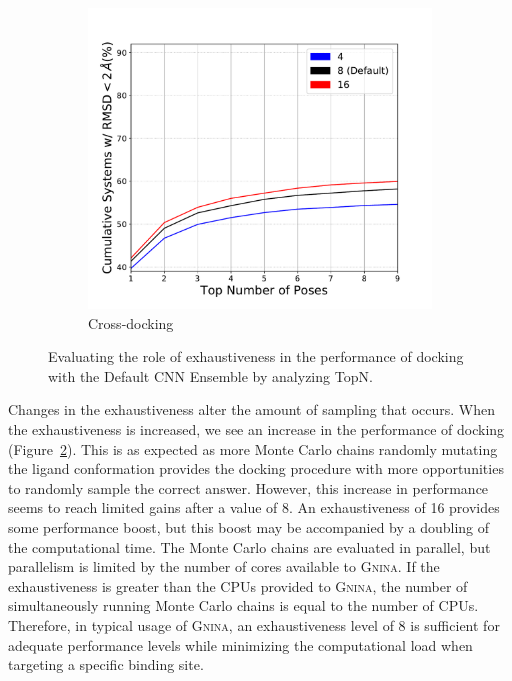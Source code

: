 \documentclass[journal=jcisd8,manuscript=article]{achemso}
\begin{document}
\begin{figure}
\begin{subfigure}[b]{0.48\textwidth}
		\includegraphics[width=\textwidth]{figures/crossdocking/sweep_exhaustiveness_line.pdf}
		\caption{Cross-docking}
		\label{fig:exhaustiveness cd}
        \end{subfigure}    
	\caption{Evaluating the role of exhaustiveness in the performance of docking with the Default CNN Ensemble by analyzing TopN.}
	\label{fig:exhaustiveness}
\end{figure}    

Changes in the exhaustiveness alter the amount of sampling that occurs. When the exhaustiveness is increased, we see an increase in the performance of docking (Figure~\ref{fig:exhaustiveness}). This is as expected as more Monte Carlo chains randomly mutating the ligand conformation provides the docking procedure with more opportunities to randomly sample the correct answer. However, this increase in performance seems to reach limited gains after a value of 8. An exhaustiveness of 16 provides some performance boost, but this boost may be accompanied by a doubling of the computational time. The Monte Carlo chains are evaluated in parallel, but parallelism is limited by the number of cores available to \textsc{Gnina}. If the exhaustiveness is greater than the CPUs provided to \textsc{Gnina}, the number of simultaneously running Monte Carlo chains is equal to the number of CPUs. Therefore, in typical usage of \textsc{Gnina}, an exhaustiveness level of 8 is sufficient for adequate performance levels while minimizing the computational load when targeting a specific binding site. 
\end{document}
